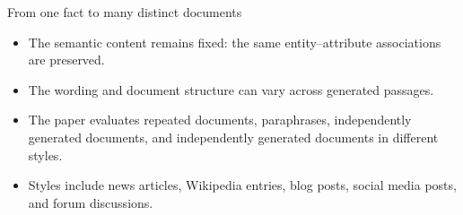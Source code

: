 \documentclass[xcolor=dvipsnames,aspectratio=169]{beamer}
\begin{document}
	\begin{frame}{From one fact to many distinct documents}
		\begin{itemize}
			\item The semantic content remains fixed: the same entity--attribute associations are preserved.
			\item The wording and document structure can vary across generated passages.
			\item The paper evaluates repeated documents, paraphrases, independently generated documents, and independently generated documents in different styles.
			\item Styles include news articles, Wikipedia entries, blog posts, social media posts, and forum discussions.
		\end{itemize}
	\end{frame}
	
\end{document}
